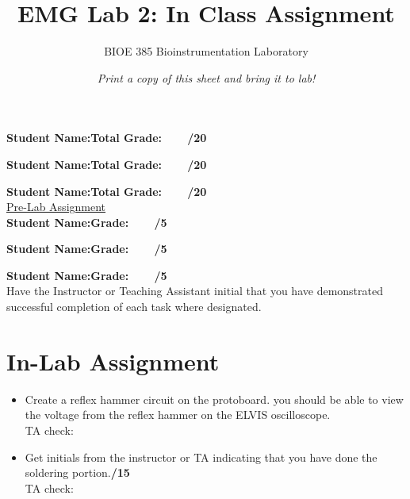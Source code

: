 \documentclass{article}
\title{EMG Lab 2: In Class Assignment}
\author{BIOE 385 Bioinstrumentation Laboratory}
\date{\textit{Print a copy of this sheet and bring it to lab!}}
\begin{document}
\large
\maketitle

\textbf{Student Name:}\hfill 	\textbf{Total Grade:\ \ \ \ /20}\vspace{0.5cm}

\textbf{Student Name:}\hfill 	\textbf{Total Grade:\ \ \ \ /20}\vspace{0.5cm}

\textbf{Student Name:}\hfill 	\textbf{Total Grade:\ \ \ \ /20}\\

\underline{Pre-Lab Assignment}\\

\textbf{Student Name:}\hfill 	\textbf{Grade:\ \ \ \ /5}\vspace{0.5cm}

\textbf{Student Name:}\hfill 	\textbf{Grade:\ \ \ \ /5}\vspace{0.5cm}

\textbf{Student Name:}\hfill 	\textbf{Grade:\ \ \ \ /5}\\

Have the Instructor or Teaching Assistant initial that you have demonstrated successful completion of each task where designated.

\section*{In-Lab Assignment}
\begin{itemize}
	\item Create a reflex hammer circuit on the protoboard. you should be able to view the voltage from the reflex hammer on the ELVIS oscilloscope.\\TA check: \underline{\hspace{2cm}}\\
	\item Get initials from the instructor or TA indicating that you have done the soldering portion.\hfill \textbf{\underline{\hspace{1cm}}/15}\\TA check: \underline{\hspace{2cm}}
\end{itemize}
\end{document}
